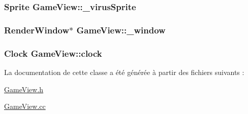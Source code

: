 \label{classGameView_a65d945763d5142e2569713a2ea97105c}
\hypertarget{classGameView_abfeeff8ffaff6a07b5d6573a1dbe59b4}{
\subsubsection[{\_\-virusSprite}]{\setlength{\rightskip}{0pt plus 5cm}Sprite {\bf GameView::\_\-virusSprite}}}
\label{classGameView_abfeeff8ffaff6a07b5d6573a1dbe59b4}
\hypertarget{classGameView_a4b79e1b1fdf2706fc7f35f82339e9670}{
\subsubsection[{\_\-window}]{\setlength{\rightskip}{0pt plus 5cm}RenderWindow$\ast$ {\bf GameView::\_\-window}}}
\label{classGameView_a4b79e1b1fdf2706fc7f35f82339e9670}
\hypertarget{classGameView_ae5f5fea8ee7e34c9ab3a86f3f7450760}{
\subsubsection[{clock}]{\setlength{\rightskip}{0pt plus 5cm}Clock {\bf GameView::clock}}}
\label{classGameView_ae5f5fea8ee7e34c9ab3a86f3f7450760}


La documentation de cette classe a été générée à partir des fichiers suivants :\begin{DoxyCompactItemize}
\item 
\hyperlink{GameView_8h}{GameView.h}\item 
\hyperlink{GameView_8cc}{GameView.cc}\end{DoxyCompactItemize}
